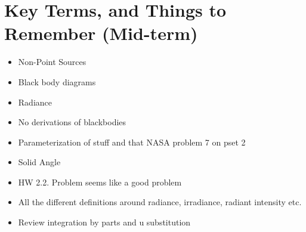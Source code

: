 \documentclass{article}
\begin{document}
\section{Key Terms, and Things to Remember (Mid-term)} 
\begin{itemize}
\item Non-Point Sources
\item Black body diagrams
\item Radiance
\item No derivations of blackbodies
\item Parameterization of stuff and that NASA problem 7 on pset 2
\item Solid Angle 
\item HW 2.2. Problem seems like a good problem
\item All the different definitions around radiance, irradiance, radiant intensity etc.
\item Review integration by parts and u substitution 



 
\end{itemize}

\clearpage












\end{document}

